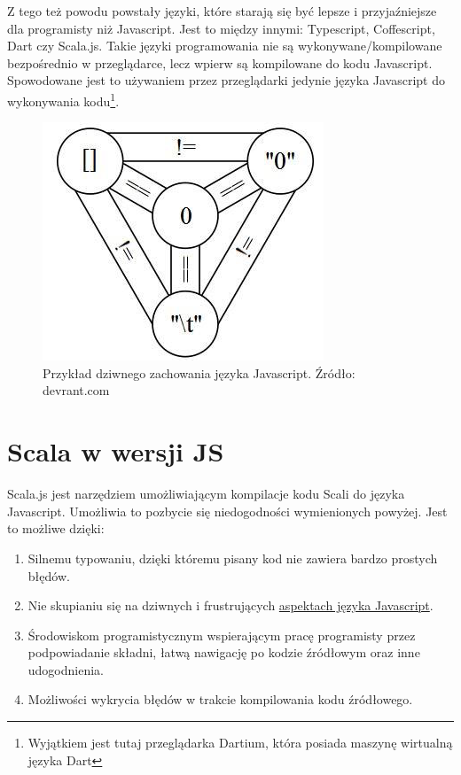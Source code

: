 Z tego też powodu powstały języki, które starają się być lepsze i przyjaźniejsze dla programisty niż Javascript. Jest to między innymi: Typescript, Coffescript, Dart czy Scala.js. Takie języki programowania nie są wykonywane/kompilowane bezpośrednio w przeglądarce, lecz wpierw są kompilowane do kodu Javascript. Spowodowane jest to używaniem przez przeglądarki jedynie języka Javascript do wykonywania kodu\footnote{Wyjątkiem jest tutaj przeglądarka Dartium, która posiada maszynę wirtualną języka Dart\cite{Dartium}}. 

\begin{figure}[h]
	\centering
	\includegraphics{images/javagod.png}
	 \caption{Przykład dziwnego zachowania języka Javascript. Źródło: devrant.com}
\end{figure}

\section{Scala w wersji JS}

Scala.js jest narzędziem umożliwiającym kompilacje kodu Scali do języka Javascript. Umożliwia to pozbycie się niedogodności wymienionych powyżej. Jest to możliwe dzięki:



\begin{enumerate}
	\item Silnemu typowaniu, dzięki któremu pisany kod nie zawiera bardzo prostych błędów.
	\item Nie skupianiu się na dziwnych i frustrujących \hyperref[lst:javascriptSUCKS]{aspektach języka Javascript}.
	\item Środowiskom programistycznym wspierającym pracę programisty przez podpowiadanie składni, łatwą nawigację po kodzie źródłowym oraz inne udogodnienia.
	\item Możliwości wykrycia błędów w trakcie kompilowania kodu źródłowego.
\end{enumerate}


